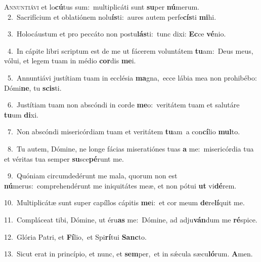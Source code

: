 \lettrine{\initial\textcolor{\initialcolor}{A}}{nnuntiávi} et lo\-\textbf{cú}\-tus sum:~\star multiplicáti sunt \textbf{su}\-per \textbf{nú}\-merum.\\
{\numbfont\textcolor{\numbcolor}{~2.}}~Sacrifícium et oblatiónem nolu\-\textbf{ís}\-ti:~\star aures autem perfe\-\textbf{cís}\-ti \textbf{mi}\-hi.\par
{\numbfont\textcolor{\numbcolor}{~3.}}~Holocáustum et pro peccáto non postu\-\textbf{lás}\-ti:~\star tunc dixi: \textbf{Ec}\-ce \textbf{vé}\-nio.\par
{\numbfont\textcolor{\numbcolor}{~4.}}~In cápite libri scriptum est de me ut fácerem voluntátem \textbf{tu}\-am:~\star Deus meus, vólui, et legem tuam in médio \textbf{cor}\-dis \textbf{me}\-i.\par
{\numbfont\textcolor{\numbcolor}{~5.}}~Annuntiávi justítiam tuam in ecclésia \textbf{ma}\-gna,~\star ecce lábia mea non prohibébo: Dómi\-\textbf{ne}\-, tu \textbf{scis}\-ti.\par
{\numbfont\textcolor{\numbcolor}{~6.}}~Justítiam tuam non abscóndi in corde \textbf{me}\-o:~\star veritátem tuam et salutáre \textbf{tu}\-um \textbf{di}\-xi.\par
{\numbfont\textcolor{\numbcolor}{~7.}}~Non abscóndi misericórdiam tuam et veritátem \textbf{tu}\-am~\star a con\-\textbf{cí}\-lio \textbf{mul}\-to.\par
{\numbfont\textcolor{\numbcolor}{~8.}}~Tu autem, Dómine, ne longe fácias miseratiónes tuas \textbf{a} me:~\star misericórdia tua et véritas tua semper \textbf{su}\-sce\-\textbf{pé}\-runt me.\par
{\numbfont\textcolor{\numbcolor}{~9.}}~Quóniam circumdedérunt me mala, quorum non est \textbf{nú}\-merus:~\star comprehendérunt me iniquitátes meæ, et non pótui \textbf{ut} vi\-\textbf{dé}\-rem.\par
{\numbfont\textcolor{\numbcolor}{10.}}~Multiplicátæ sunt super capíllos cápitis \textbf{me}\-i:~\star et cor meum \textbf{de}\-re\-\textbf{lí}\-quit me.\par
{\numbfont\textcolor{\numbcolor}{11.}}~Compláceat tibi, Dómine, ut éru\textbf{as} me:~\star Dómine, ad adju\-\textbf{ván}\-dum me \textbf{ré}\-spice.\par
{\numbfont\textcolor{\numbcolor}{12.}}~Glória Patri, et \textbf{Fí}\-lio,~\star et Spi\-\textbf{rí}\-tui \textbf{Sanc}\-to.\par
{\numbfont\textcolor{\numbcolor}{13.}}~Sicut erat in princípio, et nunc, et \textbf{sem}\-per,~\star et in sǽcula sæcu\-\textbf{ló}\-rum. \textbf{A}\-men.\par
